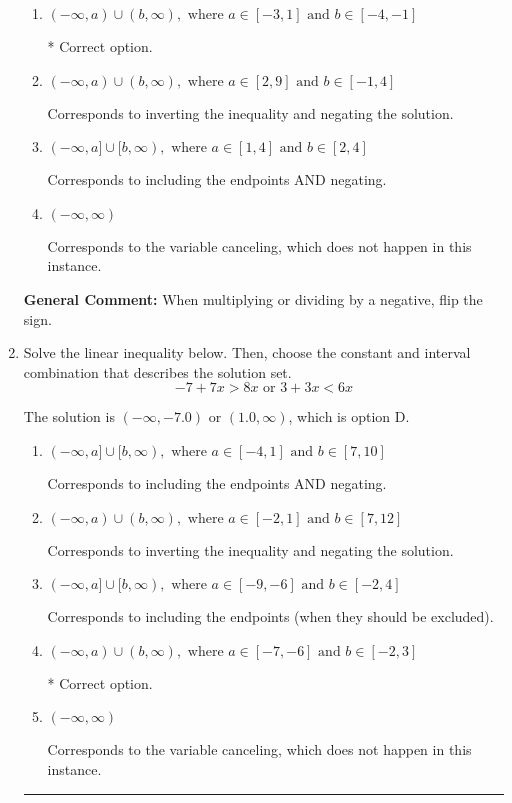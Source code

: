 \documentclass{extbook}[14pt]
\newcommand{\litem}[1]{\item #1

\rule{\textwidth}{0.4pt}}
\begin{document}
\begin{enumerate}
{\begin{enumerate}[label=\Alph*.]
Corresponds to including the endpoints (when they should be excluded).
\item \( (-\infty, a) \cup (b, \infty), \text{ where } a \in [-3, 1] \text{ and } b \in [-4, -1] \)

 * Correct option.
\item \( (-\infty, a) \cup (b, \infty), \text{ where } a \in [2, 9] \text{ and } b \in [-1, 4] \)

Corresponds to inverting the inequality and negating the solution.
\item \( (-\infty, a] \cup [b, \infty), \text{ where } a \in [1, 4] \text{ and } b \in [2, 4] \)

Corresponds to including the endpoints AND negating.
\item \( (-\infty, \infty) \)

Corresponds to the variable canceling, which does not happen in this instance.
\end{enumerate}

\textbf{General Comment:} When multiplying or dividing by a negative, flip the sign.
}
\litem{
Solve the linear inequality below. Then, choose the constant and interval combination that describes the solution set.
\[ -7 + 7 x > 8 x \text{ or } 3 + 3 x < 6 x \]

The solution is \( (-\infty, -7.0) \text{ or } (1.0, \infty) \), which is option D.\begin{enumerate}[label=\Alph*.]
\item \( (-\infty, a] \cup [b, \infty), \text{ where } a \in [-4, 1] \text{ and } b \in [7, 10] \)

Corresponds to including the endpoints AND negating.
\item \( (-\infty, a) \cup (b, \infty), \text{ where } a \in [-2, 1] \text{ and } b \in [7, 12] \)

Corresponds to inverting the inequality and negating the solution.
\item \( (-\infty, a] \cup [b, \infty), \text{ where } a \in [-9, -6] \text{ and } b \in [-2, 4] \)

Corresponds to including the endpoints (when they should be excluded).
\item \( (-\infty, a) \cup (b, \infty), \text{ where } a \in [-7, -6] \text{ and } b \in [-2, 3] \)

 * Correct option.
\item \( (-\infty, \infty) \)

Corresponds to the variable canceling, which does not happen in this instance.
\end{enumerate}

}
\end{enumerate}
\end{document}
